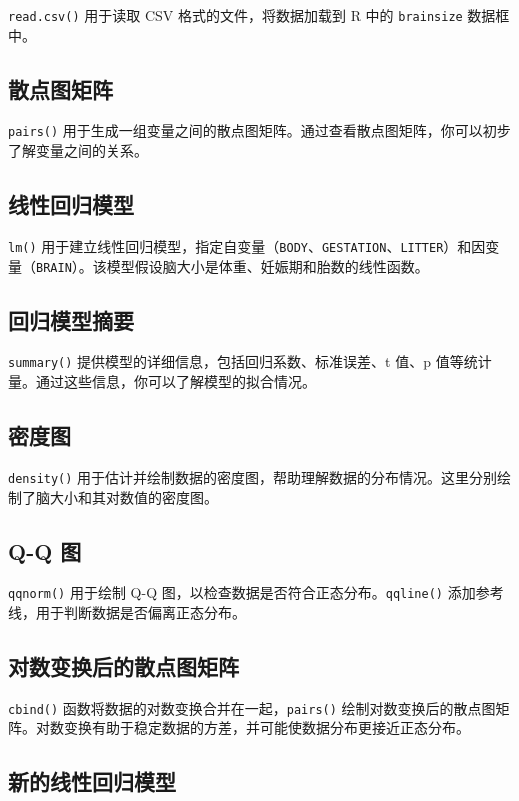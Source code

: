 \documentclass[UTF8]{report}
\theoremstyle{MyLineTheoremStyle} %
\theoremstyle{MyBlockTheoremStyle} %
\theoremstyle{MySubsubsectionStyle} %
\begin{document}
\texttt{read.csv()} 用于读取 CSV 格式的文件，将数据加载到 R 中的 \texttt{brainsize} 数据框中。

\subsection*{散点图矩阵}

\texttt{pairs()} 用于生成一组变量之间的散点图矩阵。通过查看散点图矩阵，你可以初步了解变量之间的关系。

\subsection*{线性回归模型}

\texttt{lm()} 用于建立线性回归模型，指定自变量（\texttt{BODY}、\texttt{GESTATION}、\texttt{LITTER}）和因变量（\texttt{BRAIN}）。该模型假设脑大小是体重、妊娠期和胎数的线性函数。

\subsection*{回归模型摘要}

\texttt{summary()} 提供模型的详细信息，包括回归系数、标准误差、t 值、p 值等统计量。通过这些信息，你可以了解模型的拟合情况。

\subsection*{密度图}

\texttt{density()} 用于估计并绘制数据的密度图，帮助理解数据的分布情况。这里分别绘制了脑大小和其对数值的密度图。

\subsection*{Q-Q 图}

\texttt{qqnorm()} 用于绘制 Q-Q 图，以检查数据是否符合正态分布。\texttt{qqline()} 添加参考线，用于判断数据是否偏离正态分布。

\subsection*{对数变换后的散点图矩阵}

\texttt{cbind()} 函数将数据的对数变换合并在一起，\texttt{pairs()} 绘制对数变换后的散点图矩阵。对数变换有助于稳定数据的方差，并可能使数据分布更接近正态分布。

\subsection*{新的线性回归模型}
\end{document}
